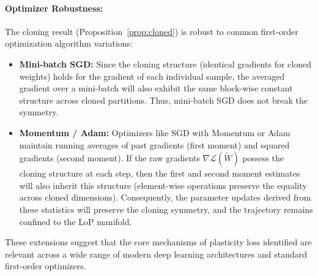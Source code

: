 \documentclass{article}
\newcommand{\Loss}{\mathcal{L}}
\begin{document}
\paragraph{Optimizer Robustness:}
The cloning result (Proposition~\ref{prop:cloned}) is robust to common first-order optimization algorithm variations:
\begin{itemize}
    \item \textbf{Mini-batch SGD:} Since the cloning structure (identical gradients for cloned weights) holds for the gradient of each individual sample, the averaged gradient over a mini-batch will also exhibit the same block-wise constant structure across cloned partitions. Thus, mini-batch SGD does not break the symmetry.
    \item \textbf{Momentum / Adam:} Optimizers like SGD with Momentum or Adam maintain running averages of past gradients (first moment) and squared gradients (second moment). If the raw gradients $\nabla\Loss(\widetilde{W})$ possess the cloning structure at each step, then the first and second moment estimates will also inherit this structure (element-wise operations preserve the equality across cloned dimensions). Consequently, the parameter updates derived from these statistics will preserve the cloning symmetry, and the trajectory remains confined to the LoP manifold.
\end{itemize}
These extensions suggest that the core mechanisms of plasticity loss identified are relevant across a wide range of modern deep learning architectures and standard first-order optimizers.
\end{document}
